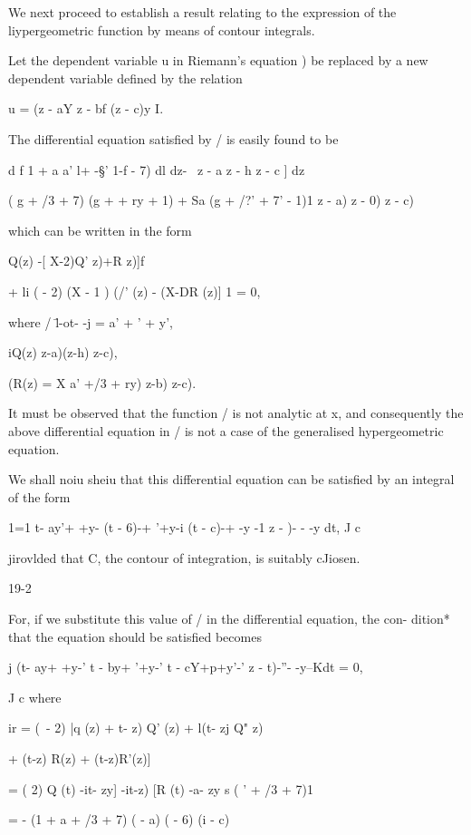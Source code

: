 
We next proceed to establish a result relating to the expression of
the liypergeometric function by means of contour integrals.

Let the dependent variable u in Riemann's equation ) be
replaced by a new dependent variable defined by the relation

u = (z - aY z - bf (z - c)y I.

The differential equation satisfied by / is easily found to be

d f 1 + a a' l+ -§' 1-f - 7) dl dz- \ z - a z - h z - c ] dz

( g + /3 + 7) (g + + ry + 1) + Sa (g + /?' + 7' - 1)1 z - a) z - 0) z
- c)

which can be written in the form

Q(z) -[ X-2)Q' z)+R z)]f

+ li ( - 2) (X - 1 ) (/' (z) - (X-DR (z)] 1 = 0,

where / \=l-ot- -j = a' + ' + y',

iQ(z) z-a)(z-h) z-c),

(R(z) = X a' +/3 + ry) z-b) z-c).

It must be observed that the function / is not analytic at x, and
consequently the above differential equation in / is not a case of the
generalised hypergeometric equation.

We shall noiu sheiu that this differential equation can be satisfied
by an integral of the form

1=1 t- ay'+ +y- (t - 6)-+ '+y-i (t - c)-+ -y -1 z - )- - -y dt, J c

jirovlded that C, the contour of integration, is suitably cJiosen.

19-2

%
%

For, if we substitute this value of / in the differential equation,
the con- dition* that the equation should be satisfied becomes

j (t- ay+ +y-' t - by+ '+y-' t - cY+p+y'-' z - t)-''- -y--Kdt = 0,

J c where

ir = (\ - 2) |q (z) + t- z) Q' (z) + l(t- zj Q" z)

+ (t-z) R(z) + (t-z)R'(z)]

= ( 2) Q (t) -it- zy] -it-z) [R (t) -a- zy s ( ' + /3 + 7)1

= - (1 + a + /3 + 7) ( - a) ( - 6) (i - c)

